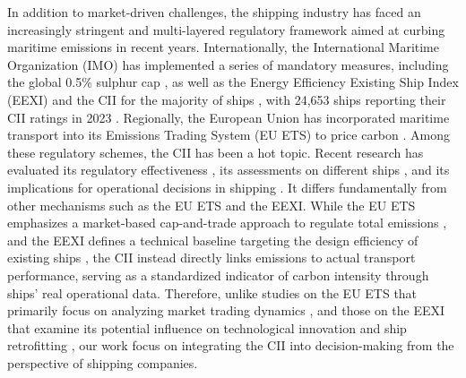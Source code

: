\documentclass[11pt,english]{article}
\begin{document}
In addition to market-driven challenges, the shipping industry has faced an increasingly stringent and multi-layered regulatory framework aimed at curbing maritime emissions in recent years. Internationally, the International Maritime Organization (IMO) has implemented a series of mandatory measures, including the global 0.5\% sulphur cap \citep{imo2020sulphurcap}, as well as the Energy Efficiency Existing Ship Index (EEXI) and the CII for the majority of ships \citep{mepc2021336}, with 24,653 ships reporting their CII ratings in 2023 \citep{imo2023mepc82}. Regionally, the European Union has incorporated maritime transport into its Emissions Trading System (EU ETS) to price carbon \citep{eu_directive_2023_959}. Among these regulatory schemes, the CII has been a hot topic. Recent research has evaluated its regulatory effectiveness \citep{wang2021paradox}, its assessments on different ships \citep{bayraktar2023scenario}, and its implications for operational decisions in shipping \citep{cheng2025cargo}. It differs fundamentally from other mechanisms such as the EU ETS and the EEXI. While the EU ETS emphasizes a market-based cap-and-trade approach to regulate total emissions \citep{ellerman2010pricing}, and the EEXI defines a technical baseline targeting the design efficiency of existing ships \citep{bayraktar2023scenario}, the CII instead directly links emissions to actual transport performance, serving as a standardized indicator of carbon intensity through ships' real operational data. Therefore, unlike studies on the EU ETS that primarily focus on analyzing market trading dynamics \citep{hintermann2016price,abrell2011assessing,zhang2010overview}, and those on the EEXI that examine its potential influence on technological innovation and ship retrofitting \citep{lee2024analysis,bayramouglu2024effects,psillas2022effective}, our work focus on integrating the CII into decision-making from the perspective of shipping companies.
\end{document}
